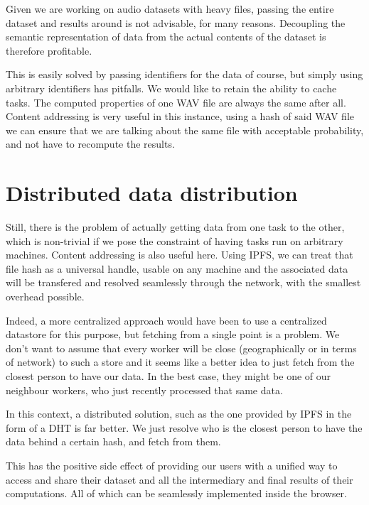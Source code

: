 \documentclass[12pt, a4paper]{article}
\begin{document}
Given we are working on audio datasets with heavy files, passing the entire dataset and results around is not advisable, for many reasons.
Decoupling the semantic representation of data from the actual contents of the dataset is therefore profitable.

This is easily solved by passing identifiers for the data of course, but simply using arbitrary identifiers has pitfalls.
We would like to retain the ability to cache tasks. The computed properties of one WAV file are always the same after all.
Content addressing is very useful in this instance, using a hash of said WAV file we can ensure that
we are talking about the same file with acceptable probability, and not have to recompute the results.

\section{Distributed data distribution}

Still, there is the problem of actually getting data from one task to the other, which is non-trivial if we pose the constraint
of having tasks run on arbitrary machines. Content addressing is also useful here. Using IPFS, we can
treat that file hash as a universal handle, usable on any machine and the associated data will be transfered and resolved seamlessly through the network, with the smallest overhead possible.

Indeed, a more centralized approach would have been to use a centralized datastore for this purpose, but fetching from a single point is a problem.
We don't want to assume that every worker will be close (geographically or in terms of network) to such a store and it seems like a better idea to just fetch from the closest person to have our data.
In the best case, they might be one of our neighbour workers, who just recently processed that same data.

In this context, a distributed solution, such as the one provided by IPFS in the form of a DHT is far better.
We just resolve who is the closest person to have the data behind a certain hash, and fetch from them.

This has the positive side effect of providing our users with a unified way to access and share their dataset and all the intermediary and final results of their computations.
All of which can be seamlessly implemented inside the browser.
\end{document}
